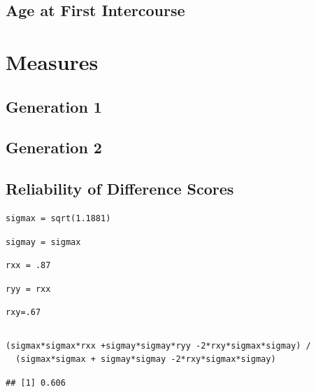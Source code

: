 \documentclass[a4paper,man,apacite,natbib,12pt,longtable]{apa6}\usepackage[]{graphicx}\usepackage[]{color}
\makeatletter
\newenvironment{kframe}{%
 \def\at@end@of@kframe{}%
 \ifinner\ifhmode%
  \def\at@end@of@kframe{\end{minipage}}%
  \begin{minipage}{\columnwidth}%
 \fi\fi%
 \def\FrameCommand##1{\hskip\@totalleftmargin \hskip-\fboxsep
 \colorbox{shadecolor}{##1}\hskip-\fboxsep
     \hskip-\linewidth \hskip-\@totalleftmargin \hskip\columnwidth}%
 \MakeFramed {\advance\hsize-\width
   \@totalleftmargin\z@ \linewidth\hsize
   \@setminipage}}%
 {\par\unskip\endMakeFramed%
 \at@end@of@kframe}
\newenvironment{knitrout}{}{} %
\makeatother
\begin{document}
\subsection{Age at First Intercourse}

%
\section{Measures}
%
\subsection{Generation 1}

%
\subsection{Generation 2}

%
\subsection{Reliability of Difference Scores}

\begin{knitrout}
\color{fgcolor}\begin{kframe}
\begin{lstlisting}[style=Rsettings]
sigmax = sqrt(1.1881)\end{lstlisting}
\begin{lstlisting}[style=Rsettings]
sigmay = sigmax\end{lstlisting}
\begin{lstlisting}[style=Rsettings]
rxx = .87\end{lstlisting}
\begin{lstlisting}[style=Rsettings]
ryy = rxx\end{lstlisting}
\begin{lstlisting}[style=Rsettings]
rxy=.67\end{lstlisting}
\begin{lstlisting}[style=Rsettings]
\end{lstlisting}
\begin{lstlisting}[style=Rsettings]
(sigmax*sigmax*rxx +sigmay*sigmay*ryy -2*rxy*sigmax*sigmay) /
  (sigmax*sigmax + sigmay*sigmay -2*rxy*sigmax*sigmay)\end{lstlisting}
\begin{lstlisting}[style=Rsettings]
## [1] 0.606
\end{lstlisting}
\end{kframe}
\end{knitrout}
\end{document}
